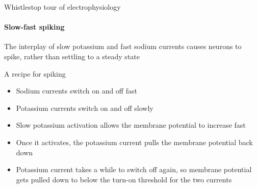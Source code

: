 \documentclass[aspectratio=169]{beamer}
\begin{document}
\begin{frame}[label={sec:org4ca7a25}]{Whistlestop tour of electrophysiology}
\framesubtitle{Slow-fast spiking}

The interplay of slow potassium and fast sodium currents causes neurons to spike, rather than settling to a steady state

\begin{block}{A recipe for spiking}
\begin{itemize}
\item Sodium currents switch on and off fast
\item Potassium currents switch on and off slowly
\item Slow potassium activation allows the membrane potential to increase fast
\item Once it activates, the potassium current pulls the membrane potential back down
\item Potassium current takes a while to switch off again, so membrane potential gets pulled down to below the turn-on threshold for the two currents
\end{itemize}
\end{block}
\end{frame}
\end{document}
